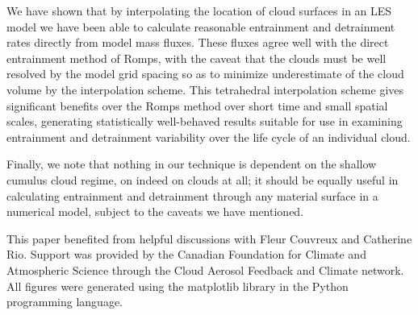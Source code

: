 \documentclass[12pt]{article}
\begin{document}
We have shown that by interpolating the location of cloud surfaces in an LES
model we have been able to calculate reasonable entrainment and detrainment 
rates directly from model mass fluxes.  These fluxes agree well with the 
direct entrainment method of Romps, with the caveat that the clouds must be 
well resolved by the model grid spacing so as to minimize underestimate of the 
cloud volume by the interpolation scheme.  This tetrahedral interpolation 
scheme gives significant benefits over the Romps method over short time and 
small spatial scales, generating statistically well-behaved results suitable 
for use in examining entrainment and detrainment variability over the life 
cycle of an individual cloud.

Finally, we note that nothing in our technique is dependent on the shallow 
cumulus cloud regime, on indeed on clouds at all; it should be equally useful
in calculating entrainment and detrainment through any material surface in a 
numerical model, subject to the caveats we have mentioned.



\begin{acknowledgment}
This paper benefited from helpful discussions with Fleur Couvreux and 
Catherine Rio.  Support was provided by the Canadian Foundation for Climate 
and Atmospheric Science through the Cloud Aerosol Feedback and Climate 
network.  All figures were generated using the matplotlib library in the 
Python programming language.
\end{acknowledgment}


\end{document}
